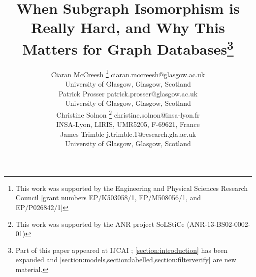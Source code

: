 \documentclass[twoside,11pt]{article}
\newcommand{\citep}[1]{\cite{#1}}
\newcommand*\samethanks[1][\value{footnote}]{\footnotemark[#1]}
\begin{document}
\title{When Subgraph Isomorphism is Really Hard, and Why This Matters for Graph
Databases\thanks{Part of this paper appeared at IJCAI \citep{DBLP:conf/ijcai/McCreeshPT16};
\cref{section:introduction} has been expanded and
\cref{section:models,section:labelled,section:filterverify} are new material.}}

\author{\name Ciaran McCreesh \thanks{This work was supported by the Engineering and Physical Sciences
           Research Council [grant numbers EP/K503058/1, EP/M508056/1, and EP/P026842/1]} \email
           ciaran.mccreesh@glasgow.ac.uk \\
       \addr University of Glasgow, Glasgow, Scotland \\
       \name Patrick Prosser \samethanks[2] \email patrick.prosser@glasgow.ac.uk \\
       \addr University of Glasgow, Glasgow, Scotland \\
       \name Christine Solnon \thanks{This work was supported
       by the ANR project SoLStiCe (ANR-13-BS02-0002-01)} \email christine.solnon@insa-lyon.fr \\
       \addr INSA-Lyon, LIRIS, UMR5205, F-69621, France \\
       \name James Trimble \samethanks[2] \email j.trimble.1@research.gla.ac.uk \\
       \addr University of Glasgow, Glasgow, Scotland}
\maketitle
\end{document}
